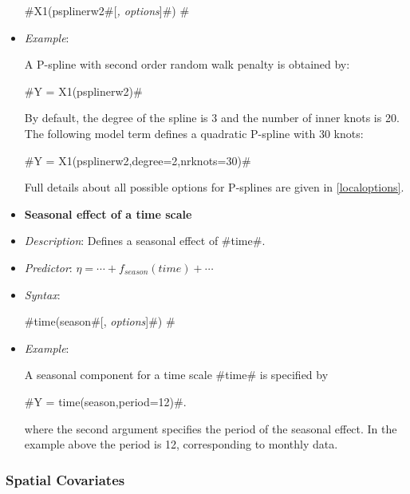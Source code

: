 \begin{itemize}
#X1(psplinerw2#[{\em , options}]#) #
\item[] {\em Example}:

A P-spline with second order random walk penalty is obtained by:

#Y = X1(psplinerw2)#

By default, the degree of the spline is 3 and the number of inner
knots is 20. The following model term defines a quadratic P-spline
with 30 knots:

#Y = X1(psplinerw2,degree=2,nrknots=30)#

Full details about all possible options for P-splines are given in
\autoref{localoptions}.

\item[] {\bf\sffamily Seasonal effect of a time scale}

\item[] {\em Description}: Defines a seasonal effect of #time#.
\item[] {\em Predictor}: $\eta =  \cdots + f_{season}(time) +
\cdots $ \item[] {\em Syntax}:

#time(season#[, {\em options}]#) #
\item[] {\em Example}:

A seasonal component for a time scale #time# is specified by

#Y = time(season,period=12)#.

where the second argument specifies the period of the seasonal
effect. In the example above the period is 12, corresponding to
monthly data.
\end{itemize}


\subsubsection*{Spatial Covariates}

